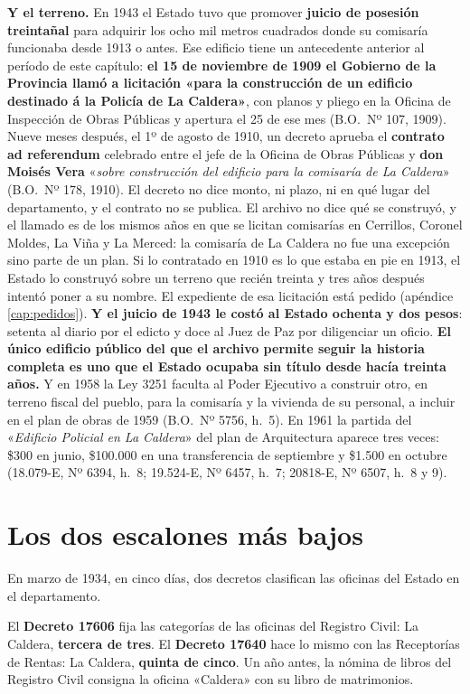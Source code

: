 \textbf{Y el terreno.} En 1943 el Estado tuvo que promover \textbf{juicio de posesión
treintañal} para adquirir los ocho mil metros cuadrados donde su comisaría funcionaba desde
1913 o antes. Ese edificio tiene un antecedente anterior al período de este capítulo: \textbf{el
15 de noviembre de 1909 el Gobierno de la Provincia llamó a licitación «para la construcción de
un edificio destinado á la Policía de La Caldera»}, con planos y pliego en la Oficina de
Inspección de Obras Públicas y apertura el 25 de ese mes (B.O.\ Nº 107, 1909). Nueve meses después, el 1º de agosto de 1910, un decreto aprueba el \textbf{contrato ad
referendum} celebrado entre el jefe de la Oficina de Obras Públicas y \textbf{don Moisés Vera}
«\textit{sobre construcción del edificio para la comisaría de La Caldera}» (B.O.\ Nº 178,
1910). El decreto no dice monto, ni plazo, ni en qué lugar del departamento, y el contrato no se
publica. El archivo no dice qué se construyó, y el llamado es de los mismos años en que se licitan
comisarías en Cerrillos, Coronel Moldes, La Viña y La Merced: la comisaría de La Caldera no fue
una excepción sino parte de un plan. Si lo contratado en 1910 es lo que estaba en pie en 1913, el
Estado lo construyó sobre un terreno que recién treinta y tres años después intentó poner a su
nombre. El expediente de esa licitación está pedido (apéndice \ref{cap:pedidos}). \textbf{Y el juicio de 1943 le costó al Estado ochenta y dos pesos}: setenta al diario por el edicto y doce al Juez de
Paz por diligenciar un oficio. \textbf{El único edificio público del que el archivo permite
seguir la historia completa es uno que el Estado ocupaba sin título desde hacía treinta años.} Y en 1958 la Ley 3251 faculta al Poder Ejecutivo a construir otro, en terreno fiscal del pueblo, para la comisaría y la vivienda de su personal, a incluir en el plan de obras de 1959 (B.O.\ Nº 5756, h.\ 5). En 1961 la partida del «\textit{Edificio Policial en La Caldera}» del plan de Arquitectura aparece tres veces: \$300 en junio, \$100.000 en una transferencia de septiembre y \$1.500 en octubre (18.079-E, Nº 6394, h.\ 8; 19.524-E, Nº 6457, h.\ 7; 20818-E, Nº 6507, h.\ 8 y 9).

\section{Los dos escalones más bajos}

En marzo de 1934, en cinco días, dos decretos clasifican las oficinas del Estado en el
departamento.

El \textbf{Decreto 17606} fija las categorías de las oficinas del Registro Civil: La Caldera,
\textbf{tercera de tres}. El \textbf{Decreto 17640} hace lo mismo con las Receptorías de Rentas:
La Caldera, \textbf{quinta de cinco}. Un año antes, la nómina de libros del Registro Civil
consigna la oficina «Caldera» con su libro de matrimonios.


